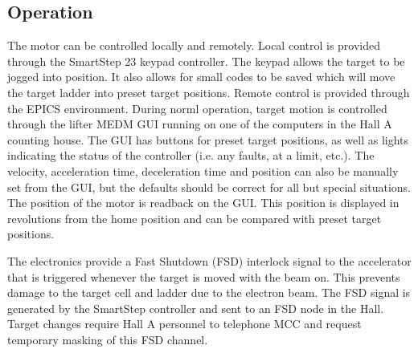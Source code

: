 {\subsection{Operation}
        The motor can be controlled locally and remotely.  Local control
is provided through the SmartStep 23 keypad controller.  The keypad 
allows the target to be jogged into position.  It also allows for small
codes to be saved which will move the target ladder into preset target
positions.  Remote control is provided through the EPICS environment.
During norml operation, target motion is controlled through the lifter
MEDM GUI running on one of the computers in the Hall A counting house.
The GUI has
buttons for preset target positions, as well as lights
indicating the status of the controller (i.e. any faults, at a limit, etc.).
The velocity, acceleration time, deceleration time and position can
also be manually set from the GUI, but the defaults should be correct
for all but special situations.  The position of the motor is readback
on the GUI.  This position is displayed in revolutions from the home
position and can be compared with preset target positions.  

        The electronics provide a Fast Shutdown (FSD) interlock signal 
to the accelerator that is triggered whenever the target is moved with
the beam on.  This prevents damage to the target
cell and ladder due to the electron beam.  The FSD signal is generated
by the SmartStep controller and sent to an FSD node in the Hall.
Target changes require Hall A personnel to telephone MCC and request
temporary masking of this FSD channel.
} %
